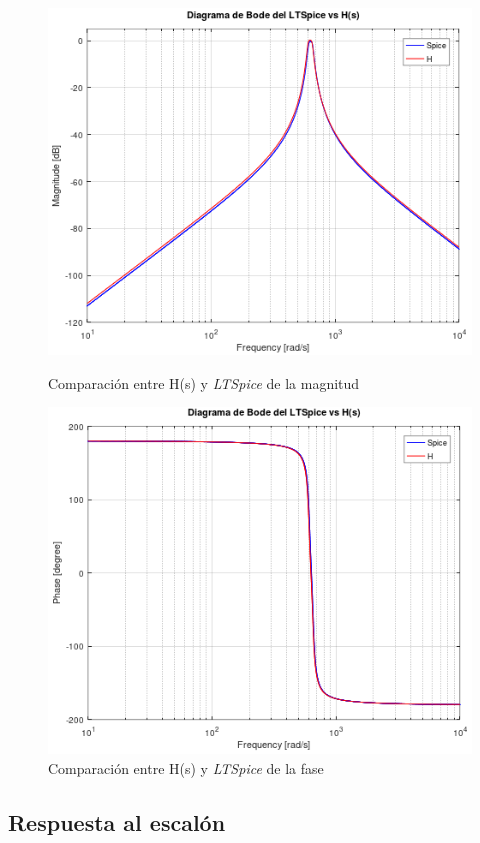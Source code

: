 \documentclass[11pt,a4paper]{report}
\begin{document}
\begin{figure}[h!]
\centering
\includegraphics[scale=0.9]{MagnitudBodeSpiceComp.png}
\caption{Comparación entre H(s) y \textit{LTSpice} de la magnitud}
\vspace{2 mm}
\includegraphics[scale=0.85]{PhaseBodeSpiceComp.png}
\caption{Comparación entre H(s) y \textit{LTSpice} de la fase}
\end{figure}

\subsection*{Respuesta al escalón}
\end{document}
